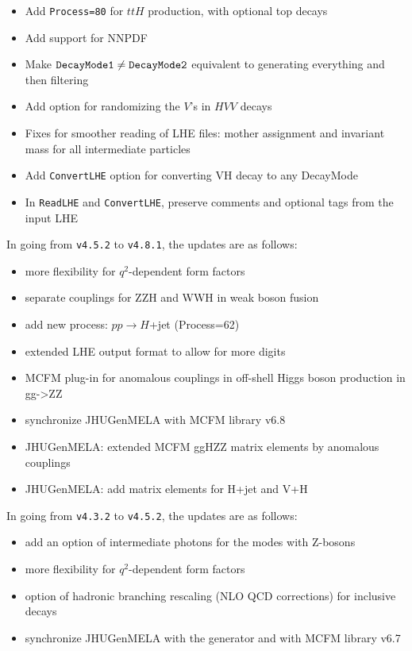 \documentclass[aps,superscriptaddress,nofootinbib]{revtex4}
\begin{document}
\begin{itemize}
\item Add \verb|Process=80| for $ttH$ production, with optional top decays
\item Add support for NNPDF
\item Make $\verb|DecayMode1|\ne\verb|DecayMode2|$ equivalent to generating everything and then filtering
\item Add option for randomizing the $V$'s in $HVV$ decays
\item Fixes for smoother reading of LHE files: mother assignment and invariant mass for all intermediate particles
\item Add \verb|ConvertLHE| option for converting VH decay to any DecayMode
\item In \verb|ReadLHE| and \verb|ConvertLHE|, preserve comments and optional tags from the input LHE
\end{itemize}

\noindent
In going from \verb|v4.5.2| to \verb|v4.8.1|, the updates are as follows:

\begin{itemize}
\item more flexibility for $q^2$-dependent form factors
\item separate couplings for ZZH and WWH in weak boson fusion
\item add new process: $pp\to H$+jet (Process=62)
\item extended LHE output format to allow for more digits
\item MCFM plug-in for anomalous couplings in off-shell Higgs boson production in gg->ZZ
\item synchronize JHUGenMELA with MCFM library v6.8
\item JHUGenMELA: extended MCFM ggHZZ matrix elements by anomalous couplings
\item JHUGenMELA: add matrix elements for H+jet and V+H
\end{itemize}


\noindent
In going from \verb|v4.3.2| to \verb|v4.5.2|, the updates are as follows:

\begin{itemize}
\item add an option of intermediate photons for the modes with Z-bosons
\item more flexibility for $q^2$-dependent form factors
\item option of hadronic branching rescaling (NLO QCD corrections) for inclusive decays
\item synchronize JHUGenMELA with the generator and with MCFM library v6.7
\end{itemize}
\end{document}
